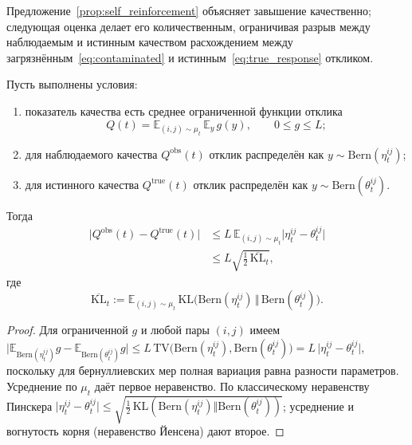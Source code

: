 Предложение~\ref{prop:self_reinforcement} объясняет завышение качественно;
следующая оценка делает его количественным, ограничивая разрыв между наблюдаемым и
истинным качеством расхождением между загрязнённым~\eqref{eq:contaminated} и
истинным~\eqref{eq:true_response} откликом.

\begin{proposition}
\label{prop:pinsker}
Пусть выполнены условия:
\begin{enumerate}[label=\textup{(\arabic*)}, leftmargin=2em]
    \item показатель качества есть среднее ограниченной функции отклика
    \[
        Q(t)=\mathbb E_{(i,j)\sim\mu_t}\,\mathbb E_{y}\,g(y),
        \qquad 0\le g\le L;
    \]
    \item для наблюдаемого качества $Q^{\mathrm{obs}}(t)$ отклик распределён как
    $y\sim\mathrm{Bern}(\eta_t^{ij})$;
    \item для истинного качества $Q^{\mathrm{true}}(t)$ отклик распределён как
    $y\sim\mathrm{Bern}(\theta_t^{ij})$.
\end{enumerate}
Тогда
\[
    \begin{aligned}
    \bigl|Q^{\mathrm{obs}}(t)-Q^{\mathrm{true}}(t)\bigr|
    &\le L\,\mathbb E_{(i,j)\sim\mu_t}
    \bigl|\eta_t^{ij}-\theta_t^{ij}\bigr|\\
    &\le L\sqrt{\tfrac12\,\overline{\mathrm{KL}}_t},
    \end{aligned}
\]
где
\[
    \overline{\mathrm{KL}}_t:=\mathbb E_{(i,j)\sim\mu_t}\,
    \mathrm{KL}\bigl(
    \mathrm{Bern}(\eta_t^{ij})\,\Vert\,
    \mathrm{Bern}(\theta_t^{ij})\bigr).
\]
\end{proposition}

\begin{proof}
Для ограниченной $g$ и любой пары $(i,j)$ имеем
$\lvert\mathbb E_{\mathrm{Bern}(\eta_t^{ij})}g
-\mathbb E_{\mathrm{Bern}(\theta_t^{ij})}g\rvert
\le L\,\mathrm{TV}\bigl(
\mathrm{Bern}(\eta_t^{ij}),\mathrm{Bern}(\theta_t^{ij})\bigr)
=L\,\lvert\eta_t^{ij}-\theta_t^{ij}\rvert$, поскольку для бернуллиевских мер
полная вариация равна разности параметров. Усреднение по $\mu_t$ даёт первое
неравенство.
По классическому неравенству Пинскера
$\lvert\eta_t^{ij}-\theta_t^{ij}\rvert
\le\sqrt{\tfrac12\,\mathrm{KL}(
\mathrm{Bern}(\eta_t^{ij})\Vert\mathrm{Bern}(\theta_t^{ij}))}$; усреднение и
вогнутость корня (неравенство Йенсена) дают второе.
\end{proof}

